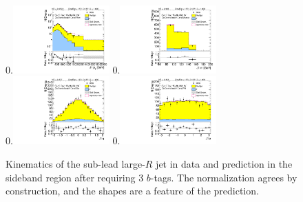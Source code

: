 \begin{figure}[htbp!]
\begin{center}
0.\includegraphics[width=0.33\textwidth, angle=270]{./figures/boosted/Control/Moriond_ThreeTag_Control_sublHCand_Pt_m_1.pdf}
0.\includegraphics[width=0.33\textwidth, angle=270]{./figures/boosted/Control/Moriond_ThreeTag_Control_sublHCand_Mass_s.pdf}\\
0.\includegraphics[width=0.33\textwidth, angle=270]{./figures/boosted/Control/Moriond_ThreeTag_Control_sublHCand_Eta.pdf}
0.\includegraphics[width=0.33\textwidth, angle=270]{./figures/boosted/Control/Moriond_ThreeTag_Control_sublHCand_Phi.pdf}
  \caption{Kinematics of the sub-lead large-$R$ jet in data and prediction in the sideband region after requiring 3 $b$-tags. The normalization agrees by construction, and the shapes are a feature of the prediction.}
  \label{fig:boosted-3b-control-ak10-subl}
\end{center}
\end{figure}

